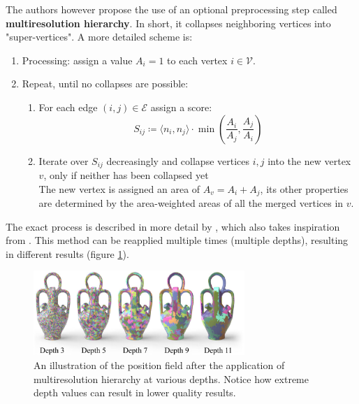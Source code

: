 \documentclass{ACGSeminar}
\begin{document}
The authors however propose the use of an optional preprocessing step called \textbf{multiresolution hierarchy}. In short, it collapses neighboring vertices into "super-vertices". A more detailed scheme is:
\begin{enumerate}
	\item	Processing: assign a value $A_i = 1$ to each vertex $i \in \mathcal{V}$.
	\item	Repeat, until no collapses are possible:
			\begin{enumerate}
				\item	For each edge $(i,j) \in \mathcal{E}$ assign a score:
						\begin{equation*}
							S_{ij} \coloneqq \langle n_i, n_j \rangle \cdot \min(\frac{A_i}{A_j}, \frac{A_j}{A_i})
						\end{equation*}
				\item	Iterate over $S_{ij}$ decreasingly and collapse vertices $i,j$ into the new vertex $v$, only if neither has been collapsed yet\\
						The new vertex is assigned an area of $A_v = A_i + A_j$, its other properties are determined by the area-weighted areas of all the merged vertices in $v$.
			\end{enumerate}
\end{enumerate}
The exact process is described in more detail by \cite{jakob2015instant}, which also takes inspiration from \cite{botsch2006primo}. This method can be reapplied multiple times (multiple depths), resulting in different results (figure \ref{fig:multireolution-hierarchy-depths}).

\begin{figure}[htb!]
	\begin{centering}
		\includegraphics[width=8cm]{img/multiresolution-hierarchy-depths.png}\par
	\end{centering}
	\caption{An illustration of the position field after the application of multiresolution hierarchy at various depths. Notice how extreme depth values can result in lower quality results. \cite{jakob2015instant}}
	\label{fig:multireolution-hierarchy-depths}
\end{figure}
\end{document}
